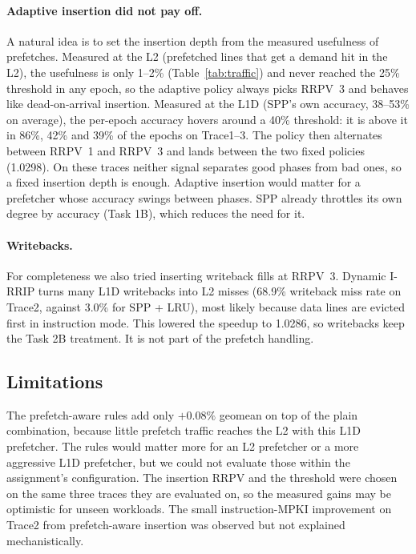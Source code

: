 \documentclass[11pt]{article}
\begin{document}
\paragraph{Adaptive insertion did not pay off.} A natural idea is to set the insertion depth from
the measured usefulness of prefetches. Measured at the L2 (prefetched lines that get a demand hit
in the L2), the usefulness is only 1--2\% (Table~\ref{tab:traffic}) and never reached the 25\% threshold
in any epoch, so the adaptive policy always picks RRPV~3 and behaves like dead-on-arrival insertion. Measured at the L1D (SPP's own
accuracy, 38--53\% on average), the per-epoch accuracy hovers around a 40\% threshold: it is
above it in 86\%, 42\% and 39\% of the epochs on Trace1--3. The policy then alternates between
RRPV~1 and RRPV~3 and lands between the two fixed policies (1.0298). On these traces neither signal separates good phases from bad
ones, so a fixed insertion depth is enough. Adaptive insertion would matter for a prefetcher whose accuracy swings between
phases. SPP already throttles its own degree by accuracy (Task 1B), which reduces the need for it.

\paragraph{Writebacks.} For completeness we also tried inserting writeback fills at RRPV~3. Dynamic
I-RRIP turns many L1D writebacks into L2 misses (68.9\% writeback miss rate on Trace2, against
3.0\% for SPP + LRU), most likely because data lines are evicted first in instruction
mode. This lowered the
speedup to 1.0286, so writebacks keep the Task 2B treatment. It is not part of the prefetch
handling.

\subsection{Limitations}

The prefetch-aware rules add only $+0.08\%$ geomean on top of the plain combination, because
little prefetch traffic reaches the L2 with this L1D prefetcher. The rules would matter more for
an L2 prefetcher or a more aggressive L1D prefetcher, but we could not evaluate those within the
assignment's configuration. The insertion RRPV and the threshold were chosen on the same three
traces they are evaluated on, so the measured gains may be optimistic for unseen workloads. The
small instruction-MPKI improvement on Trace2 from prefetch-aware insertion was observed but not
explained mechanistically.
\end{document}
